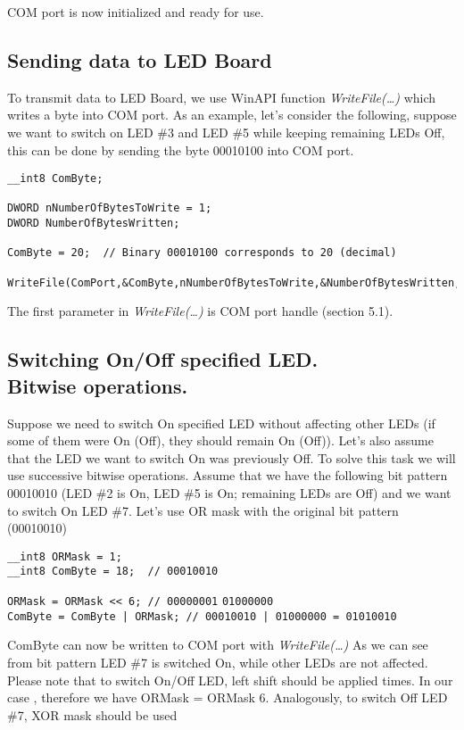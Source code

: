 \documentclass{article}
\begin{document}
COM port is now initialized and ready for use.

\subsection{Sending data to LED Board}

To transmit data to LED Board, we use WinAPI function
\emph{WriteFile(\ldots)} which writes a byte into COM port. As an
example, let's consider the following, suppose we want to switch on
LED \#3 and LED \#5 while keeping remaining LEDs Off, this can be
done by sending the byte 00010100 into COM port.

\begin{verbatim}
__int8 ComByte;

DWORD nNumberOfBytesToWrite = 1;
DWORD NumberOfBytesWritten;

ComByte = 20;  // Binary 00010100 corresponds to 20 (decimal)

WriteFile(ComPort,&ComByte,nNumberOfBytesToWrite,&NumberOfBytesWritten,NULL);
\end{verbatim}
The first parameter in \emph{WriteFile(\ldots)} is COM port handle
(section 5.1).
\subsection{Switching On/Off specified LED.\\ Bitwise operations.}
Suppose we need to switch On specified LED without affecting other
LEDs (if some of them were On (Off), they should remain On (Off)).
Let's also assume that the LED we want to switch On was previously
Off. To solve this task we will use successive bitwise operations.
Assume that we have the following bit pattern 00010010 (LED \#2 is
On, LED \#5 is On; remaining LEDs are Off) and we want to switch On
LED \#7. Let's use OR mask with the original bit pattern (00010010)
\begin {verbatim}
__int8 ORMask = 1;
__int8 ComByte = 18;  // 00010010
\end{verbatim}
\verb"ORMask = ORMask << 6; // 00000001" 
\verb"01000000"\\
\verb"ComByte = ComByte | ORMask; // 00010010 | 01000000 = 01010010"

\vspace*{0.4cm}

ComByte can now be written to COM port with \emph{WriteFile(\ldots)}
As we can see from bit pattern LED \#7 is switched On, while other
LEDs are not affected. Please note that to switch On/Off 
LED, left shift should be applied  times. In our case ,
therefore we have ORMask = ORMask  6. Analogously, to switch Off
LED \#7, XOR mask should be used
\end{document}
